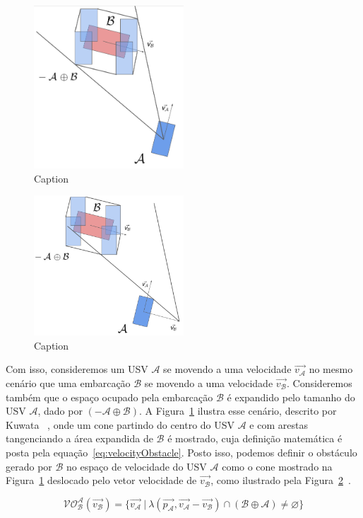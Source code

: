         \begin{figure}
            \centering
            \includegraphics[width=0.5\textwidth]{fig/chap2/cone_shaped.png}
            \caption{Caption}
            \label{fig:cone_shaped}
        \end{figure}
        
        \begin{figure}
            \centering
            \includegraphics[width=0.5\textwidth]{fig/chap2/vo.png}
            \caption{Caption}
            \label{fig:vo}
        \end{figure}
        
        Com isso, consideremos um USV $\mathcal{A}$ se movendo a uma velocidade $\vec{v_\mathcal{A}}$ no mesmo cenário que uma embarcação $\mathcal{B}$ se movendo a uma velocidade $\vec{v_\mathcal{B}}$. Consideremos também que o espaço ocupado pela embarcação $\mathcal{B}$ é expandido pelo tamanho do USV $\mathcal{A}$, dado por $(-\mathcal{A} \oplus \mathcal{B})$. A Figura~\ref{fig:cone_shaped} ilustra esse cenário, descrito por Kuwata \etal~\cite{KUWATA2014110}, onde um cone partindo do centro do USV $\mathcal{A}$ e com arestas tangenciando a área expandida de $\mathcal{B}$ é mostrado, cuja definição matemática é posta pela equação~\eqref{eq:velocityObstacle}. Posto isso, podemos definir o obstáculo gerado por $\mathcal{B}$ no espaço de velocidade do USV $\mathcal{A}$ como o cone mostrado na Figura~\ref{fig:cone_shaped} deslocado pelo vetor velocidade de $\vec{v_\mathcal{B}}$, como ilustrado pela Figura~\ref{fig:vo}~\cite{KUWATA2014110}.
        
        \begin{equation}\label{eq:velocityObstacle}
            \mathcal{VO^A_B}(\vec{v_\mathcal{B}}) = \{\vec{v_\mathcal{A}}~|~\lambda(\vec{p_\mathcal{A}}, \vec{v_\mathcal{A}} - \vec{v_\mathcal{B}}) \cap (\mathcal{B} \oplus \mathcal{A}) \neq \varnothing\}
        \end{equation}
        
        